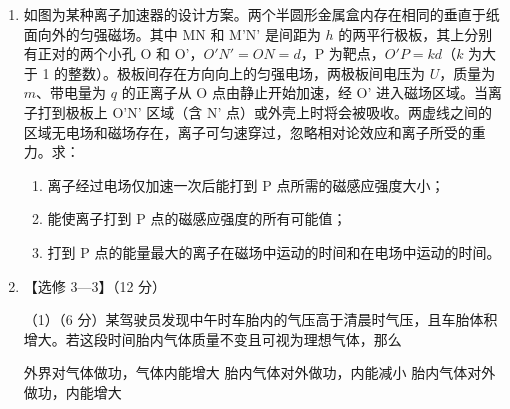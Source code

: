 \documentclass[\gkver]{gaokaozhenti}
\begin{document}
\begin{enumerate}
\item
如图为某种离子加速器的设计方案。两个半圆形金属盒内存在相同的垂直于纸面向外的匀强磁场。其中 MN 和 M'N' 是间距为 $h$ 的两平行极板，其上分别有正对的两个小孔 O 和 O'，$O'N'=ON=d$，P 为靶点，$O'P=kd$（$k$ 为大于 1 的整数）。极板间存在方向向上的匀强电场，两极板间电压为 $U$，质量为 $m$、带电量为 $q$ 的正离子从 O 点由静止开始加速，经 O' 进入磁场区域。当离子打到极板上 O'N' 区域（含 N' 点）或外壳上时将会被吸收。两虚线之间的区域无电场和磁场存在，离子可匀速穿过，忽略相对论效应和离子所受的重力。求：

\begin{enumerate}
	\item
	离子经过电场仅加速一次后能打到 P 点所需的磁感应强度大小；

	\item
	能使离子打到 P 点的磁感应强度的所有可能值；

	\item
	打到 P 点的能量最大的离子在磁场中运动的时间和在电场中运动的时间。
\end{enumerate}



\item
【选修 3—3】（12 分）

（1）（6 分）某驾驶员发现中午时车胎内的气压高于清晨时气压，且车胎体积增大。若这段时间胎内气体质量不变且可视为理想气体，那么

{外界对气体做功，气体内能增大}
{胎内气体对外做功，内能减小}
{胎内气体对外做功，内能增大}


\end{enumerate}
\end{document}
